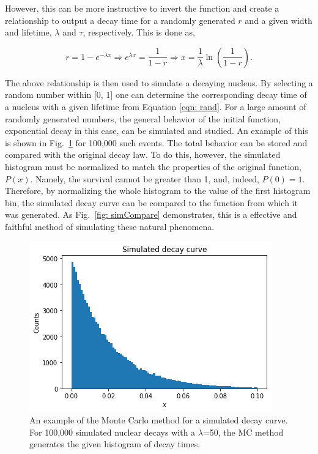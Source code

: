 However, this can be more instructive to invert the function and create a relationship to output a decay time for a randomly generated $r$ and a given width and lifetime, $\lambda$ and $\tau$, respectively.  This is done as,

\begin{equation}
r = 1 - e^{-\lambda x} \Rightarrow e^{\lambda x} = \dfrac{1}{1-r} \Rightarrow x = \dfrac{1}{\lambda} \ln \left( \frac{1}{1-r} \right).
\label{eqn: rand}
\end{equation}

\noindent The above relationship is then used to simulate a decaying nucleus. By selecting a random number within [0, 1] one can determine the corresponding decay time of a nucleus with a given lifetime from Equation \ref{eqn: rand}. For a large amount of randomly generated numbers, the general behavior of the initial function, exponential decay in this case, can be simulated and studied. An example of this is shown in Fig.\ \ref{fig: simExample} for 100,000 such events. The total behavior can be stored and compared with the original decay law. To do this, however, the simulated histogram must be normalized to match the properties of the original function, $P(x)$.  Namely, the survival cannot be greater than 1, and, indeed, $P(0) = 1$. Therefore, by normalizing the whole histogram to the value of the first histogram bin, the simulated decay curve can be compared to the function from which it was generated. As Fig.\ \ref{fig: simCompare} demonstrates, this is a effective and faithful method of simulating these natural phenomena. 


\begin{figure}
\centering
\includegraphics[width=0.85\linewidth]{figures/simExample.png}
\caption{An example of the Monte Carlo method for a simulated decay curve. For 100,000 simulated nuclear decays with a $\lambda$=50, the MC method generates the given histogram of decay times.  }
\label{fig: simExample}
\end{figure}


